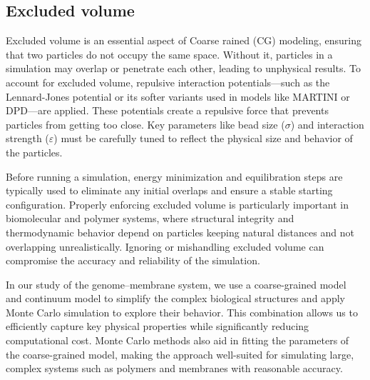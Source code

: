 \documentclass[12pt]{article}
\begin{document}
\begin{flushleft}
\vspace{-1em} 
\subsection*{Excluded volume}

Excluded volume is an essential aspect of Coarse rained (CG) modeling, ensuring that two particles do not occupy the same space. Without it, particles in a simulation may overlap or penetrate each other, leading to unphysical results. To account for excluded volume, repulsive interaction potentials—such as the Lennard-Jones potential or its softer variants used in models like MARTINI or DPD—are applied. These potentials create a repulsive force that prevents particles from getting too close. Key parameters like bead size ($\sigma$) and interaction strength ($\varepsilon$) must be carefully tuned to reflect the physical size and behavior of the particles.

Before running a simulation, energy minimization and equilibration steps are typically used to eliminate any initial overlaps and ensure a stable starting configuration. Properly enforcing excluded volume is particularly important in biomolecular and polymer systems, where structural integrity and thermodynamic behavior depend on particles keeping natural distances and not overlapping unrealistically. Ignoring or mishandling excluded volume can compromise the accuracy and reliability of the simulation.





In our study of the genome–membrane system, we use a coarse-grained model and continuum model to simplify the complex biological structures and apply Monte Carlo simulation to explore their behavior. This combination allows us to efficiently capture key physical properties while significantly reducing computational cost. Monte Carlo methods also aid in fitting the parameters of the coarse-grained model, making the approach well-suited for simulating large, complex systems such as polymers and membranes with reasonable accuracy.

\end{flushleft}
\end{document}
